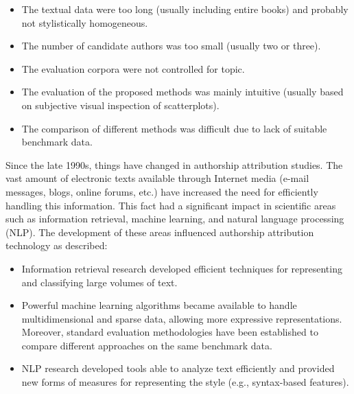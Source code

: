 \begin{itemize}
	\item The textual data were too long (usually including entire books) and probably not stylistically homogeneous.
	\item The number of candidate authors was too small (usually two or three).
	\item The evaluation corpora were not controlled for topic.
	\item The evaluation of the proposed methods was mainly intuitive (usually based on subjective visual inspection of scatterplots).
	\item The comparison of different methods was difficult due to lack of suitable benchmark data.
\end{itemize}

Since the late 1990s, things have changed in authorship attribution studies. The vast amount of electronic texts available through Internet media (e-mail messages, blogs, online
forums, etc.) have increased the need for efficiently handling this information. This fact had a significant impact in scientific areas such as information retrieval, machine learning,
and natural language processing (NLP). The development of these areas influenced authorship attribution technology as described:
\begin{itemize}
	\item Information retrieval research developed efficient techniques for representing and classifying large volumes of text.
	\item Powerful machine learning algorithms became available to handle multidimensional and sparse data, allowing more expressive representations. Moreover, standard evaluation
	methodologies have been established to compare different approaches on the same benchmark data.
	\item NLP research developed tools able to analyze text efficiently and provided new forms of measures for representing the style (e.g., syntax-based features).
\end{itemize}

